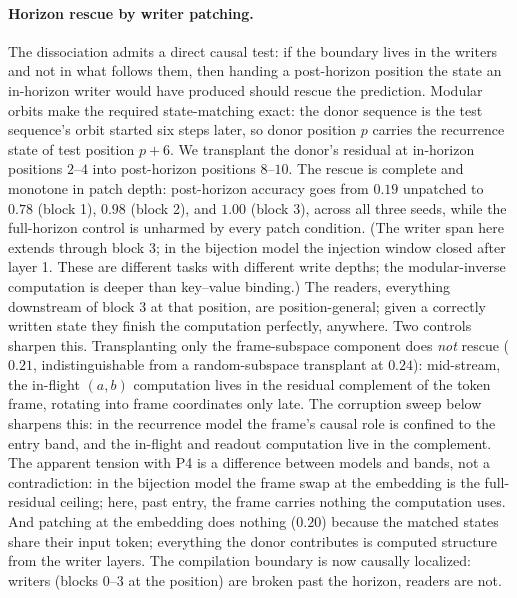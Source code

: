 \documentclass[11pt]{article}
\begin{document}
\paragraph{Horizon rescue by writer patching.} The dissociation admits a
direct causal test: if the boundary lives in the writers and not in
what follows them, then handing a post-horizon position the state an
in-horizon writer would have produced should rescue the prediction.
Modular orbits make the required state-matching exact: the donor
sequence is the test sequence's orbit started six steps later, so donor
position $p$ carries the recurrence state of test position
$p{+}6$. We transplant the donor's residual at in-horizon positions
$2$--$4$ into post-horizon positions $8$--$10$. The rescue is complete
and monotone in patch depth: post-horizon accuracy goes from $0.19$
unpatched to $0.78$ (block 1), $0.98$ (block 2), and $1.00$ (block 3),
across all three seeds, while the full-horizon control is unharmed by
every patch condition. (The writer span here extends through block 3;
in the bijection model the injection window closed after layer 1. These
are different tasks with different write depths; the modular-inverse
computation is deeper than key--value binding.) The readers, everything
downstream of block 3 at that position, are position-general; given a correctly written state
they finish the computation perfectly, anywhere. Two controls sharpen
this. Transplanting only the frame-subspace component does \emph{not}
rescue ($0.21$, indistinguishable from a random-subspace transplant at
$0.24$): mid-stream, the in-flight $(a,b)$ computation lives in the
residual complement of the token frame, rotating into frame coordinates
only late. The corruption sweep below sharpens this: in the recurrence
model the frame's causal role is confined to the entry band, and the
in-flight and readout computation live in the complement. The apparent
tension with P4 is a difference between models and bands, not a
contradiction: in the bijection model the frame swap at the embedding
is the full-residual ceiling; here, past entry, the frame carries
nothing the computation uses. And patching at the
embedding does nothing ($0.20$) because the matched states share their
input token; everything the donor contributes is computed structure from
the writer layers. The compilation boundary is now causally localized:
writers (blocks 0--3 at the position) are broken past the horizon,
readers are not.
\end{document}
